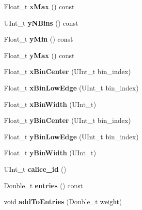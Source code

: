 \begin{DoxyCompactItemize}
\item 
Float\_\-t {\bfseries xMax} () const \label{classhistmgr_1_1Histogram2D_a96a6a6d6dff2e8fe03a368c462c88952}

\item 
UInt\_\-t {\bfseries yNBins} () const \label{classhistmgr_1_1Histogram2D_a948a659fdd1a04946da319aacf809a75}

\item 
Float\_\-t {\bfseries yMin} () const \label{classhistmgr_1_1Histogram2D_acbe0f9156f69af35e7701796424efc57}

\item 
Float\_\-t {\bfseries yMax} () const \label{classhistmgr_1_1Histogram2D_a6e170388b9fe540e4553b2056691045d}

\item 
Float\_\-t {\bfseries xBinCenter} (UInt\_\-t bin\_\-index)\label{classhistmgr_1_1Histogram2D_a34240deb29b7af10792e82ab00a1ba96}

\item 
Float\_\-t {\bfseries xBinLowEdge} (UInt\_\-t bin\_\-index)\label{classhistmgr_1_1Histogram2D_a86e526af29aa24c0a0486f84d800fecf}

\item 
Float\_\-t {\bfseries xBinWidth} (UInt\_\-t)\label{classhistmgr_1_1Histogram2D_ac8fd83fa10fc3468361e4d2e56d50442}

\item 
Float\_\-t {\bfseries yBinCenter} (UInt\_\-t bin\_\-index)\label{classhistmgr_1_1Histogram2D_afed2edc77e0353c1366dc555f49e22c0}

\item 
Float\_\-t {\bfseries yBinLowEdge} (UInt\_\-t bin\_\-index)\label{classhistmgr_1_1Histogram2D_a3084d9ba1b47a865c36745fd19c7e7d3}

\item 
Float\_\-t {\bfseries yBinWidth} (UInt\_\-t)\label{classhistmgr_1_1Histogram2D_acc19b4a6e328acb6899de0c7504e2343}

\item 
UInt\_\-t {\bfseries calice\_\-id} ()\label{classhistmgr_1_1Histogram2D_aa6ea5c5bb5ff2b0fc7f6a8e9a5f3e625}

\item 
Double\_\-t {\bfseries entries} () const \label{classhistmgr_1_1Histogram2D_abb7d72e42edb6531399b10a91794382a}

\item 
void {\bfseries addToEntries} (Double\_\-t weight)\label{classhistmgr_1_1Histogram2D_a98f58e8e6d67a3430fb9047552c95b17}


\end{DoxyCompactItemize}
